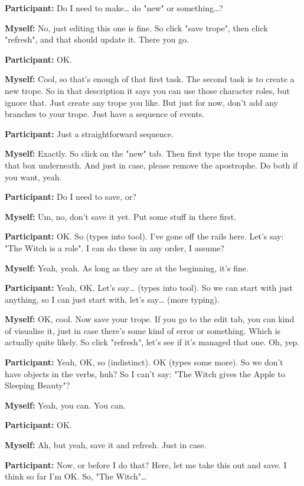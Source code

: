 \documentclass[11pt]{report}
\begin{document}
\begin{linenumbers}
\textbf{Participant:} Do I need to make\ldots{} do "new" or something\ldots{}?

\textbf{Myself:} No, just editing this one is fine. So click "save trope", then click "refresh", and that should update it. There you go.

\textbf{Participant:} OK.

\textbf{Myself:} Cool, so that's enough of that first task. The second task is to create a new trope. So in that description it says you can use those character roles, but ignore that. Just create any trope you like. But just for now, don't add any branches to your trope. Just have a sequence of events.

\textbf{Participant:} Just a straightforward sequence.

\textbf{Myself:} Exactly. So click on the "new" tab. Then first type the trope name in that box underneath. And just in case, please remove the apostrophe. Do both if you want, yeah.

\textbf{Participant:} Do I need to save, or?

\textbf{Myself:} Um, no, don't save it yet. Put some stuff in there first.

\textbf{Participant:} OK. So (types into tool). I've gone off the rails here. Let's say: "The Witch is a role". I can do these in any order, I assume?

\textbf{Myself:} Yeah, yeah. As long as they are at the beginning, it's fine.

\textbf{Participant:} Yeah, OK. Let's say\ldots{} (types into tool). So we can start with just anything, so I can just start with, let's say\ldots{} (more typing).

\textbf{Myself:} OK, cool. Now save your trope. If you go to the edit tab, you can kind of visualise it, just in case there's some kind of error or something. Which is actually quite likely. So click "refresh", let's see if it's managed that one. Oh, yep.

\textbf{Participant:} Yeah, OK, so (indistinct). OK (types some more). So we
don't have objects in the verbs, huh? So I can't say: "The Witch gives the Apple
to Sleeping Beauty"?

\textbf{Myself:} Yeah, you can. You can.

\textbf{Participant:} OK.

\textbf{Myself:} Ah, but yeah, save it and refresh. Just in case.

\textbf{Participant:} Now, or before I do that? Here, let me take this out and save. I think so far I'm OK. So, "The Witch"\ldots{}


\end{linenumbers}
\end{document}
